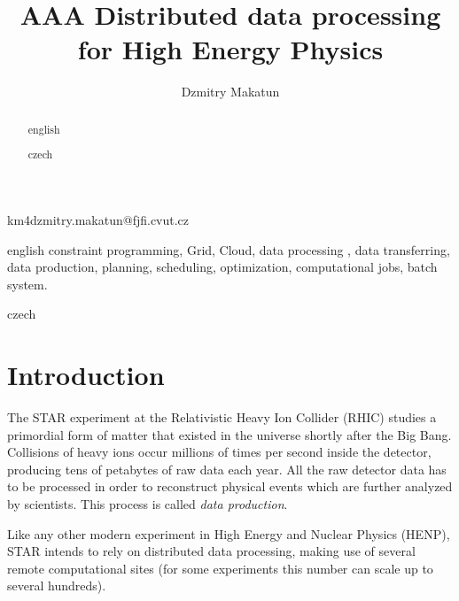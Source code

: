 \documentclass[english]{ddny}
\begin{document}
\title{AAA Distributed data processing for High Energy Physics}
\author{Dzmitry Makatun}{km}{4}{dzmitry.makatun@fjfi.cvut.cz}




\maketitle

\begin{abstract}{english}

\end{abstract}

\begin{keywords}{english}
constraint programming, Grid, Cloud, data processing , data transferring, data production, planning, scheduling, optimization, computational jobs, batch system.
\end{keywords}

\begin{abstract}{czech}

\end{abstract}

\begin{keywords}{czech}

\end{keywords}

\tableofcontents


\section{Introduction}
The STAR experiment at the Relativistic Heavy Ion Collider (RHIC) studies a primordial form of matter that existed in the universe shortly after the Big Bang. Collisions of heavy ions occur millions of times per second inside the detector, producing tens of petabytes of raw data each year. All the raw detector data has to be processed in order to reconstruct physical events which are further analyzed by scientists. This process is called \textit{data production}.

Like any other modern experiment in High Energy and Nuclear Physics (HENP), STAR intends to rely on distributed data processing, making use of several remote computational sites (for some experiments this number can scale up to several hundreds).
\end{document}
